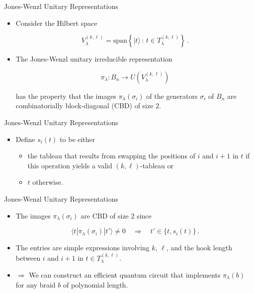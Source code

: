 \documentclass[slideColor]{prosper}
\renewcommand{\>}{\rangle}
\newcommand{\<}{\langle}
\begin{document}

\begin{slide}{Jones-Wenzl Unitary Representations}

\begin{itemize}
\item Consider the Hilbert space

\[
V_\lambda^{(k,\ell)}=\mathrm{span}\left\{|t\> \, : \, t\in T_\lambda^{(k,\ell)} \right\}\,.
\]

\medskip
\item The Jones-Wenzl unitary irreducible representation 

\medskip
\[
\pi_\lambda : B_n \rightarrow U\left(V_\lambda^{(k,\ell)}\right)
\]

\medskip
has the property that the images $\pi_\lambda(\sigma_i)$ of the generators $\sigma_i$ of $B_n$ are combinatorially block-diagonal (CBD) of size $2$.
\end{itemize}

\end{slide}


\begin{slide}{Jones-Wenzl Unitary Representations}

\begin{itemize}
\item Define $s_i(t)$ to be either

\medskip
\begin{itemize}
\item the tableau that results from swapping the positions of $i$ and $i+1$ in $t$ if this operation yields a valid $(k,\ell)$-tableau or

\medskip
\item $t$ otherwise.
\end{itemize}
\end{itemize}
\end{slide}


\begin{slide}{Jones-Wenzl Unitary Representations}

\begin{itemize}
\item The images $\pi_\lambda(\sigma_i)$ are CBD of size $2$ since

\bigskip
\[
\<t|\pi_\lambda(\sigma_i)|t'\>\neq 0 \quad\Rightarrow\quad t' \in \{ t, s_i(t) \}\,.
\]

\bigskip
\item The entries are simple expressions involving $k$, $\ell$, and the hook length between $i$ and $i+1$ in $t\in T_\lambda^{(k,\ell)}$.

\bigskip
\item $\Rightarrow$ We can construct an efficient quantum circuit that implements $\pi_\lambda(b)$ for any braid $b$ of polynomial length.


\end{itemize}

\end{slide}
\end{document}
